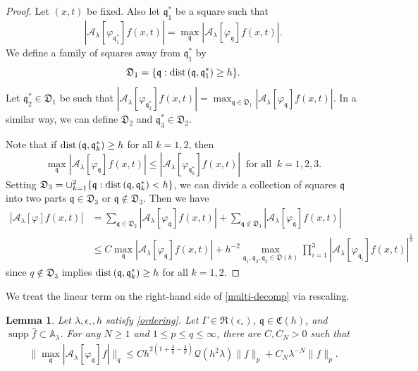 \documentclass[10pt] %
{amsart}
\theoremstyle{plain}
\newtheorem{lem}[thm]{Lemma}
\numberwithin{equation}{section}
\newcommand{\dist} {\text{dist\! }}
\DeclareMathOperator{\supp}{supp}
\newcommand{\fq}{\mathfrak q}
\begin{document}
\begin{proof}
Let $(x,t)$ be fixed. Also let  $\mathfrak q_1^\ast$ be a square such that  
\[
|\mathcal A_\lambda[\varphi_{\mathfrak q_1^\ast }] f(x,t)| = \max_{\mathfrak q} |\mathcal A_\lambda[\varphi_{\mathfrak q}] f(x,t)| .
\]
We define a family of squares away from $\mathfrak q_1^\ast$ by 
\[
\mathfrak D_1 = \{ \mathfrak q  : \dist (\fq, \fq_1^\ast) \ge h \}  . 
\]
Let $\mathfrak q_2^\ast\in \mathfrak D_1$ be such that $|\mathcal A_\lambda[\varphi_{\mathfrak q_2^\ast }] f(x,t)| = \max_{\mathfrak q\in \mathfrak D_1} |\mathcal A_\lambda[\varphi_{\mathfrak q}] f(x,t)|$.
In a similar way, we can define $\mathfrak D_2 $ and $\mathfrak q_3^\ast\in \mathfrak D_2$. 

Note that if $\dist (\mathfrak q, \mathfrak q_k^\ast) \ge h$ for all $k=1,2$, then 
\[
\max_{\mathfrak q} |\mathcal A_\lambda[\varphi_{\mathfrak q }] f(x,t)| \le  |\mathcal A_\lambda[\varphi_{\mathfrak q_k^\ast}] f(x,t)| ~\text{ for all }~ k=1,2,3. 
\]
Setting $\mathfrak D_3 = \cup_{k=1}^2 \{  \mathfrak q  :\dist (\mathfrak q, \mathfrak q_k^\ast) < h  \}$, we can divide a collection of  squares $\mathfrak q$ into two parts $\mathfrak q \in \mathfrak D_3$ or $\mathfrak q \notin \mathfrak D_3$.
Then we have 
\begin{align*}
|\mathcal A_\lambda[\varphi] f(x,t)| &  =\sum_{ \mathfrak q\in \mathfrak D_3 } |\mathcal A_\lambda[\varphi_{ \fq}]f(x,t) | + \sum_{ \mathfrak q\notin \mathfrak D_3 } |\mathcal A_\lambda[\varphi_{ \fq}]f(x,t)| \\
& \le C \max_{\mathfrak q} |\mathcal A_\lambda[\varphi_{ \fq}]f(x,t) | +  h^{-2}  \max_{\mathfrak q_1,\mathfrak q_2,\mathfrak q_3 \in \mathfrak D(h)} \prod_{i=1}^3  |\mathcal A_\lambda[\varphi_{ \fq_i}]f(x,t) |^{\frac13}
\end{align*}
since $q\notin \mathfrak D_3$ implies $\dist(\mathfrak q, \mathfrak q_k^\ast) \ge h$ for all $k=1,2$.
\end{proof}








We treat the linear term on the right-hand side of \eqref{multi-decomp} via rescaling.
 
\begin{lem} 
Let $\lambda,\epsilon_\circ, h$ satisfy \eqref{ordering}. Let $\Gamma 
\in\mathfrak R (\epsilon_\circ)$, $\fq \in  \mathfrak C(h)$, and  $\supp \widehat f  \subset   \mathbb A_\lambda$.
For any $N\ge1$ and $1\le p \le q \le \infty$, there are $C, C_N>0$ such that
\begin{align}\label{linear 1}
\big\|\max_{\fq}|\mathcal A_\lambda [\varphi_{\fq}]f|\big\|_{q}
\le C h^{2(1+\frac3q-\frac3p)}
\mathscr Q ( h^2 \lambda) 
\|f\|_p  +C_N\lambda^{-N}\|f\|_p .
\end{align}
\end{lem}
\end{document}
